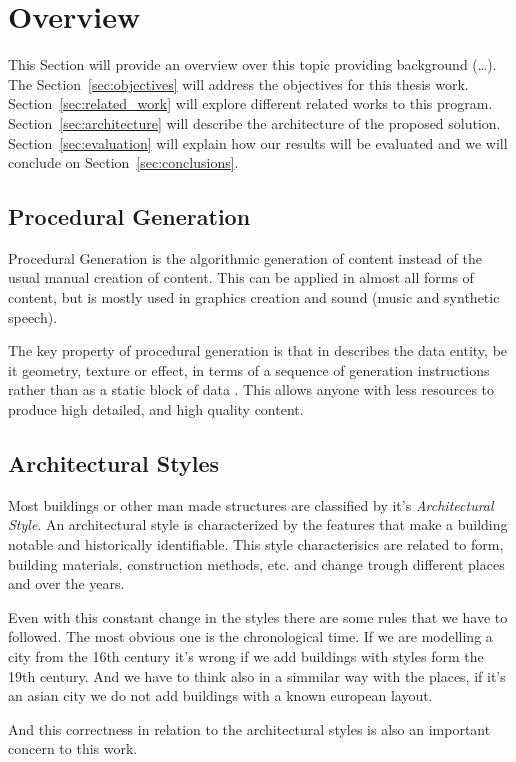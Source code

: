 
% 
% 

\section{Overview} %
\label{sec:overview}


This Section will provide an overview over this topic providing background (\dots). The Section~\ref{sec:objectives} will address the objectives for this thesis work. Section~\ref{sec:related_work} will explore different related works to this program. Section~\ref{sec:architecture} will describe the architecture of the proposed solution. Section~\ref{sec:evaluation} will explain how our results will be evaluated and we will conclude on Section~\ref{sec:conclusions}.

\subsection{Procedural Generation} %
\label{sub:procedural_generation}


Procedural Generation is the algorithmic generation of content instead of the usual manual creation of content. This can be applied in almost all forms of content, but is mostly used in graphics creation and sound (music and synthetic speech).

The key property of procedural generation is that in describes the data entity, be it geometry, texture or effect, in terms of a sequence of generation instructions rather than as a static block of data \cite{Kelly}. This allows anyone with less resources to produce high detailed, and high quality content.




\subsection{Architectural Styles} %
\label{sub:architectural_styles}

Most buildings or other man made structures are classified by it's \emph{Architectural Style}. An architectural style is characterized by the features that make a building notable and historically identifiable. This style characterisics are related to form, building materials, construction methods, etc. and change trough different places and over the years. 

Even with this constant change in the styles there are some rules that we have to followed. The most obvious one is the chronological time.
If we are modelling a city from the 16th century it's wrong if we add buildings with styles form the 19th century. And we have to think also in a simmilar way with the places, if it's an asian city we do not add buildings with a known european layout.

And this correctness in relation to the architectural styles is also an important concern to this work.



